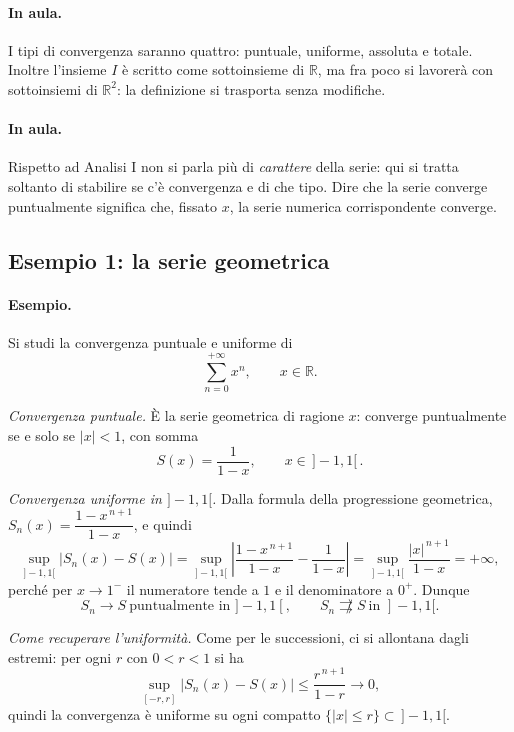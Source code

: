 \paragraph{In aula.} I tipi di convergenza saranno quattro: puntuale, uniforme, assoluta e
totale. Inoltre l'insieme $I$ è scritto come sottoinsieme di $\mathbb{R}$, ma fra poco si
lavorerà con sottoinsiemi di $\mathbb{R}^2$: la definizione si trasporta senza modifiche.

\paragraph{In aula.} Rispetto ad Analisi I non si parla più di \emph{carattere} della
serie: qui si tratta soltanto di stabilire se c'è convergenza e di che tipo. Dire che la
serie converge puntualmente significa che, fissato $x$, la serie numerica corrispondente
converge.

\subsection{Esempio 1: la serie geometrica}

\paragraph{Esempio.} Si studi la convergenza puntuale e uniforme di
\begin{equation}
\sum_{n=0}^{+\infty}x^n,\qquad x\in\mathbb{R}.
\end{equation}

\emph{Convergenza puntuale.} È la serie geometrica di ragione $x$: converge puntualmente
se e solo se $|x|<1$, con somma
\begin{equation}
S(x)=\frac{1}{1-x},\qquad x\in\,]-1,1[\,.
\end{equation}

\emph{Convergenza uniforme in $]-1,1[$.} Dalla formula della progressione geometrica,
$S_n(x)=\dfrac{1-x^{\,n+1}}{1-x}$, e quindi
\begin{equation}
\sup_{]-1,1[}\big|S_n(x)-S(x)\big|
=\sup_{]-1,1[}\left|\frac{1-x^{\,n+1}}{1-x}-\frac{1}{1-x}\right|
=\sup_{]-1,1[}\frac{|x|^{\,n+1}}{1-x}=+\infty ,
\end{equation}
perché per $x\to1^-$ il numeratore tende a $1$ e il denominatore a $0^+$. Dunque
\[
S_n\to S\ \text{puntualmente in }]-1,1[,\qquad S_n\not\rightrightarrows S\ \text{in }]-1,1[.
\]

\emph{Come recuperare l'uniformità.} Come per le successioni, ci si allontana dagli
estremi: per ogni $r$ con $0<r<1$ si ha
\begin{equation}
\sup_{[-r,r]}\big|S_n(x)-S(x)\big|\le\frac{r^{\,n+1}}{1-r}\longrightarrow 0,
\end{equation}
quindi la convergenza è uniforme su ogni compatto $\{|x|\le r\}\subset\,]-1,1[$.

